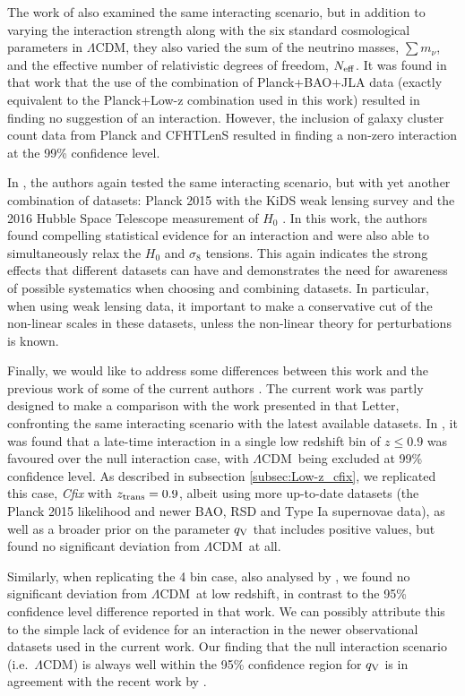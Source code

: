 \documentclass[a4paper,fleqn,usenatbib]{mnras}
\newcommand*{\LCDM}{$\Lambda$CDM}
\begin{document}
The work of \cite{Kumar:2017dnp} also examined the same interacting scenario, but in addition to varying the interaction strength along with the six standard cosmological parameters in \LCDM, they also varied the sum of the neutrino masses, $\sum m_\nu$, and the effective number of relativistic degrees of freedom, $N_{\rm eff}$. It was found in that work that the use of the combination of Planck+BAO+JLA data (exactly equivalent to the Planck+Low-z combination used in this work) resulted in finding no suggestion of an interaction. However, the inclusion of galaxy cluster count data from Planck \citep{PlanckSZ2015} and CFHTLenS \citep{Heymans:2013fya} resulted in finding a non-zero interaction at the 99\% confidence level.

In \cite{Kumar:2019wfs}, the authors again tested the same interacting scenario, but with yet another combination of datasets: Planck 2015 with the KiDS weak lensing survey \citep{Kohlinger2017} and the 2016 Hubble Space Telescope measurement of $H_0$ \citep{Riess2016}. In this work, the authors found compelling statistical evidence for an interaction and were also able to simultaneously relax the $H_0$ and $\sigma_8$ tensions. This again indicates the strong effects that different datasets can have and demonstrates the need for awareness of possible systematics when choosing and combining datasets. In particular, when using weak lensing data, it important to make a conservative cut of the non-linear scales in these datasets, unless the non-linear theory for perturbations is known.

Finally, we would like to address some differences between this work and the previous work of some of the current authors \citep{Salvatelli2014}. The current work was partly designed to make a comparison with the work presented in that Letter, confronting the same interacting scenario with the latest available datasets. In \cite{Salvatelli2014}, it was found that a late-time interaction in a single low redshift bin of $z\leq 0.9$ was favoured over the null interaction case, with \LCDM~being excluded at 99\% confidence level. As described in subsection \ref{subsec:Low-z_cfix}, we replicated this  case, \textit{Cfix} with $z_{\rm trans}=0.9$, albeit using more up-to-date datasets (the Planck 2015 likelihood and newer BAO, RSD and Type Ia supernovae data), as well as a broader prior on the parameter $q_{\rm V}$ that includes positive values,  but found no significant deviation from \LCDM~at all.

Similarly, when replicating the 4 bin case, also analysed by \cite{Salvatelli2014}, we found no significant deviation from \LCDM~at low redshift, in contrast to the 95\% confidence level difference reported in that work. We can possibly attribute this to the simple lack of evidence for an interaction in the newer observational datasets used in the current work. Our finding that the null interaction scenario (i.e.\ \LCDM) is always well within the 95\% confidence region for $q_{\rm V}$ is in agreement with the recent work by \cite{Yang:2018qec}.
\end{document}
